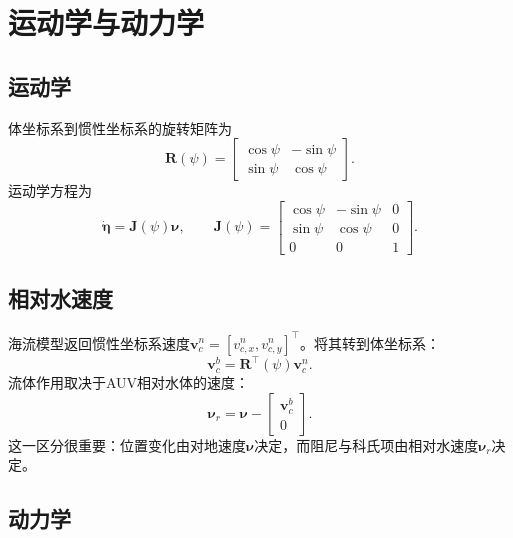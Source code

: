 \documentclass[11pt,a4paper]{ctexart}
\begin{document}
\section{运动学与动力学}

\subsection{运动学}

体坐标系到惯性坐标系的旋转矩阵为
\begin{equation}
\bm R(\psi)=
\begin{bmatrix}
\cos\psi&-\sin\psi\\
\sin\psi& \cos\psi
\end{bmatrix}.
\end{equation}
运动学方程为
\begin{equation}
\dot{\bm\eta}=\bm J(\psi)\bm\nu,
\qquad
\bm J(\psi)=
\begin{bmatrix}
\cos\psi&-\sin\psi&0\\
\sin\psi& \cos\psi&0\\
0&0&1
\end{bmatrix}.
\end{equation}

\subsection{相对水速度}

海流模型返回惯性坐标系速度$\bm v_c^n=[v_{c,x}^n,v_{c,y}^n]^\top$。将其转到体坐标系：
\begin{equation}
\bm v_c^b=\bm R^\top(\psi)\bm v_c^n.
\end{equation}
流体作用取决于AUV相对水体的速度：
\begin{equation}
\bm\nu_r=\bm\nu-
\begin{bmatrix}
\bm v_c^b\\0
\end{bmatrix}.
\end{equation}
这一区分很重要：位置变化由对地速度$\bm\nu$决定，而阻尼与科氏项由相对水速度$\bm\nu_r$决定。

\subsection{动力学}
\end{document}
